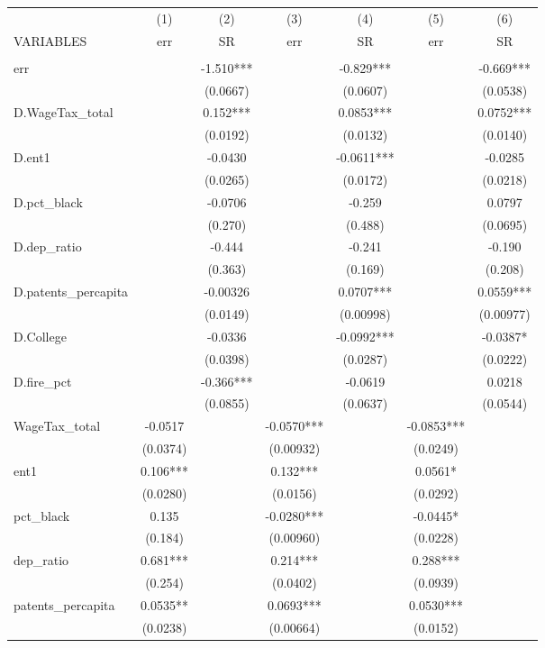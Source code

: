 \begin{tabular}{lcccccc} \hline
 & (1) & (2) & (3) & (4) & (5) & (6) \\
VARIABLES & err & SR & err & SR & err & SR \\ \hline
 &  &  &  &  &  &  \\
err &  & -1.510*** &  & -0.829*** &  & -0.669*** \\
 &  & (0.0667) &  & (0.0607) &  & (0.0538) \\
D.WageTax\_total &  & 0.152*** &  & 0.0853*** &  & 0.0752*** \\
 &  & (0.0192) &  & (0.0132) &  & (0.0140) \\
D.ent1 &  & -0.0430 &  & -0.0611*** &  & -0.0285 \\
 &  & (0.0265) &  & (0.0172) &  & (0.0218) \\
D.pct\_black &  & -0.0706 &  & -0.259 &  & 0.0797 \\
 &  & (0.270) &  & (0.488) &  & (0.0695) \\
D.dep\_ratio &  & -0.444 &  & -0.241 &  & -0.190 \\
 &  & (0.363) &  & (0.169) &  & (0.208) \\
D.patents\_percapita &  & -0.00326 &  & 0.0707*** &  & 0.0559*** \\
 &  & (0.0149) &  & (0.00998) &  & (0.00977) \\
D.College &  & -0.0336 &  & -0.0992*** &  & -0.0387* \\
 &  & (0.0398) &  & (0.0287) &  & (0.0222) \\
D.fire\_pct &  & -0.366*** &  & -0.0619 &  & 0.0218 \\
 &  & (0.0855) &  & (0.0637) &  & (0.0544) \\
WageTax\_total & -0.0517 &  & -0.0570*** &  & -0.0853*** &  \\
 & (0.0374) &  & (0.00932) &  & (0.0249) &  \\
ent1 & 0.106*** &  & 0.132*** &  & 0.0561* &  \\
 & (0.0280) &  & (0.0156) &  & (0.0292) &  \\
pct\_black & 0.135 &  & -0.0280*** &  & -0.0445* &  \\
 & (0.184) &  & (0.00960) &  & (0.0228) &  \\
dep\_ratio & 0.681*** &  & 0.214*** &  & 0.288*** &  \\
 & (0.254) &  & (0.0402) &  & (0.0939) &  \\
patents\_percapita & 0.0535** &  & 0.0693*** &  & 0.0530*** &  \\
 & (0.0238) &  & (0.00664) &  & (0.0152) &  \\

\end{tabular}
